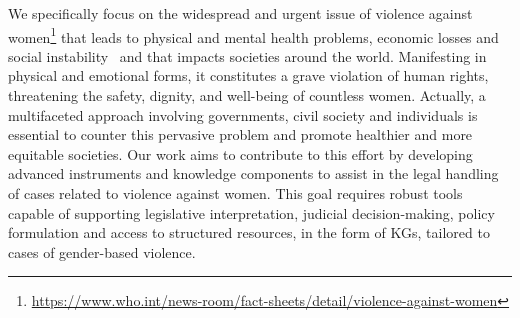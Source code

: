 \documentclass[runningheads]{llncs}
\begin{document}
We specifically focus on the widespread and urgent issue of violence against women\footnote{\url{https://www.who.int/news-room/fact-sheets/detail/violence-against-women}}  %
that leads to physical and mental health problems, economic losses and social instability~\cite{dawa2022violence} and that impacts societies around the world. Manifesting in physical and emotional forms, it constitutes a grave violation of human rights, threatening the safety, dignity, and well-being of countless women. 
%
Actually, a multifaceted approach involving governments, civil society and individuals is essential to counter this pervasive problem and promote healthier and more equitable societies. 
Our work aims to contribute to this effort by developing advanced instruments and knowledge components to assist in the legal handling of cases related to violence against women. %
%
%
This %
goal requires robust %
tools %
capable of supporting legislative interpretation, judicial decision-making, policy formulation %
and access to structured resources, in the form of KGs, tailored to cases of gender-based violence. 
%
\end{document}
